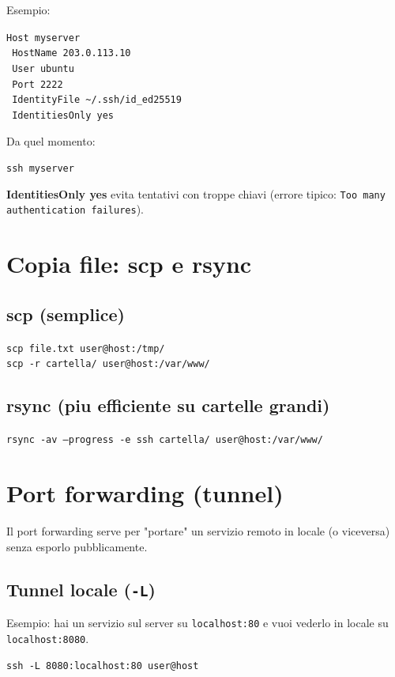 \documentclass[a4paper,11pt]{article}
\begin{document}
Esempio:
\begin{codebox}
\texttt{Host myserver} \\
\texttt{  HostName 203.0.113.10} \\
\texttt{  User ubuntu} \\
\texttt{  Port 2222} \\
\texttt{  IdentityFile \textasciitilde/.ssh/id\_ed25519} \\
\texttt{  IdentitiesOnly yes}
\end{codebox}

Da quel momento:
\begin{codebox}
\texttt{ssh myserver}
\end{codebox}

\begin{infobox}
\textbf{IdentitiesOnly yes} evita tentativi con troppe chiavi (errore tipico: \texttt{Too many authentication failures}).
\end{infobox}

\section{Copia file: scp e rsync}
\subsection{scp (semplice)}
\begin{codebox}
\texttt{scp file.txt user@host:/tmp/} \\
\texttt{scp -r cartella/ user@host:/var/www/}
\end{codebox}

\subsection{rsync (piu efficiente su cartelle grandi)}
\begin{codebox}
\texttt{rsync -av --progress -e ssh cartella/ user@host:/var/www/}
\end{codebox}

\section{Port forwarding (tunnel)}
Il port forwarding serve per "portare" un servizio remoto in locale (o viceversa) senza esporlo pubblicamente.

\subsection{Tunnel locale (\texttt{-L})}
Esempio: hai un servizio sul server su \texttt{localhost:80} e vuoi vederlo in locale su \texttt{localhost:8080}.
\begin{codebox}
\texttt{ssh -L 8080:localhost:80 user@host}
\end{codebox}
\end{document}
